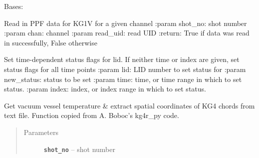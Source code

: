 \documentclass[letterpaper,10pt,english]{sphinxmanual}
\begin{document}
\begin{fulllineitems}
\label{kg1_ppf_data:kg1_ppf_data.Kg1PPFData}
Bases: {\hyperref[signal_base:signal_base.SignalBase]{}}

\begin{fulllineitems}
\label{kg1_ppf_data:kg1_ppf_data.Kg1PPFData.read_data}
Read in PPF data for KG1V for a given channel
:param shot\_no: shot number
:param chan: channel
:param read\_uid: read UID
:return: True if data was read in successfully, False otherwise

\end{fulllineitems}


\begin{fulllineitems}
\label{kg1_ppf_data:kg1_ppf_data.Kg1PPFData.set_status}
Set time-dependent status flags for lid.
If neither time or index are given, set status flags for all time points
:param lid: LID number to set status for
:param new\_status: status to be set
:param time: time, or time range in which to set status.
:param index: index, or index range in which to set status.

\end{fulllineitems}


\begin{fulllineitems}
\label{kg1_ppf_data:kg1_ppf_data.Kg1PPFData.get_coord}
Get vacuum vessel temperature \& extract spatial coordinates of KG4 chords from text file.
Function copied from A. Boboc's kg4r\_py code.
\begin{quote}\begin{description}
\item[{Parameters}] \leavevmode
\textbf{\texttt{shot\_no}} -- shot number

\end{description}\end{quote}


\end{fulllineitems}
\end{fulllineitems}
\end{document}
